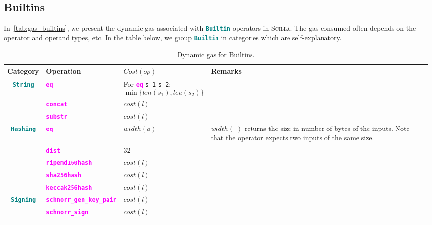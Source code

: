 \documentclass[9pt]{article}
\begin{document}
\subsection{Builtins}

In~\autoref{tab:gas_builtins}, we present the dynamic gas associated with
\textbf{\texttt{\textcolor{teal}{Builtin}}} operators in \textsc{Scilla}. The
gas consumed often depends on the operator and operand types, etc. In the table
below, we group \textbf{\texttt{\textcolor{teal}{Builtin}}} in categories which
are self-explanatory.

\begin{table}[!hbt]
	\caption{Dynamic gas for  Builtins. \label{tab:gas_builtins} }
\centering
	\begin{tabular}{|c|p{4.1cm}|p{4cm}|p{5cm}|}
	\hline
		\textbf{Category} & \textbf{Operation} & \textbf{$Cost(op)$} & \textbf{Remarks} \\ \hline
		\multirow{3}{*}{\textbf{\texttt{\textcolor{teal}{String}}}} &
		\textbf{\texttt{\textcolor{magenta}{eq}}} & For \textbf{ \texttt{\textcolor{magenta}{eq}}} \texttt{s\_1} \texttt{s\_2}: $$ \min \{len(s_1), len(s_2)\} $$ 
		& \\
		\cline{2-4}
		 & \texttt{\textbf{\textcolor{magenta}{concat}}} & $cost(l)$  & \\ \cline{2-4}
		 & \textbf{\texttt{\textcolor{magenta}{substr}}} & $cost(l)$  & \\ \hline \hline
		\multirow{5}{*}{\textbf{\texttt{\textcolor{teal}{Hashing}}}} &
		  \textbf{\texttt{\textcolor{magenta}{eq}}} & $ width(a) $  & $width(\cdot)$
		  returns the size in number of bytes of the inputs. Note that the
		  operator expects two inputs of the same size.  \\ \cline{2-4}
		 & \textbf{\texttt{\textcolor{magenta}{dist}}} & $32$  & \\ \cline{2-4}
		 & \textbf{\texttt{\textcolor{magenta}{ripemd160hash}}} & $cost(l)$  & \\
		\cline{2-4}
		 & \textbf{\texttt{\textcolor{magenta}{sha256hash}}} & $cost(l)$  & \\ \cline{2-4}
		 & \textbf{\texttt{\textcolor{magenta}{keccak256hash}}} & $cost(l)$  & \\ \hline
		 \hline
		\multirow{4}{*}{\textbf{\texttt{\textcolor{teal}{Signing}}}} &
		\textbf{\texttt{\textcolor{magenta}{schnorr\_gen\_key\_pair}}} & $cost(l)$  & \\
		\cline{2-4}
		 & \textbf{\texttt{\textcolor{magenta}{schnorr\_sign}}} & $cost(l)$  & \\ \cline{2-4}

\end{tabular}
\end{table}
\end{document}

